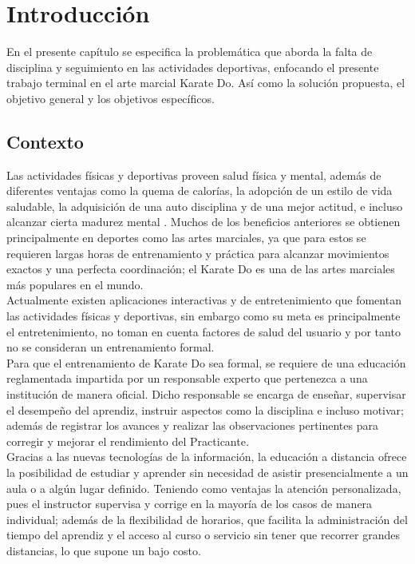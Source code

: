 \chapter{Introducción}
En el presente capítulo se especifica la problemática que aborda la falta de disciplina y seguimiento en las actividades deportivas, enfocando el presente trabajo terminal en el arte marcial Karate Do. Así como la solución propuesta, el objetivo general y los objetivos específicos.
\section{Contexto}
Las actividades físicas y deportivas proveen salud física y mental, además de diferentes ventajas como la quema de calorías, la adopción de un estilo de vida saludable, la adquisición de una auto disciplina y de una mejor actitud, e incluso alcanzar cierta madurez mental \cite{Shotokan}. Muchos de los beneficios anteriores se obtienen principalmente en deportes como las artes marciales, ya que para estos se requieren largas horas de entrenamiento y práctica para alcanzar movimientos exactos y una perfecta coordinación; el Karate Do es una de las artes marciales más populares en el mundo.\\

Actualmente existen aplicaciones interactivas y de entretenimiento que fomentan las actividades físicas y deportivas, sin embargo como su meta es principalmente el entretenimiento, no toman en cuenta factores de salud del usuario y por tanto no se consideran un entrenamiento formal.\\

Para que el entrenamiento de Karate Do sea formal, se requiere de una educación reglamentada impartida por un responsable experto que pertenezca a una institución de manera oficial. Dicho responsable se encarga de enseñar, supervisar el desempeño del aprendiz, instruir aspectos como la disciplina e incluso  motivar; además de registrar los avances y realizar las observaciones pertinentes para corregir y mejorar el rendimiento del Practicante.\\

Gracias a las nuevas tecnologías de la información, la educación a distancia ofrece la posibilidad de estudiar y aprender sin necesidad de asistir presencialmente a un aula o a algún lugar definido. Teniendo como ventajas la atención personalizada, pues el instructor supervisa y corrige en la mayoría de los casos de manera individual; además de la flexibilidad de horarios, que facilita la administración del tiempo del aprendiz y el acceso al curso o servicio sin tener que recorrer grandes distancias, lo que supone un bajo costo.
